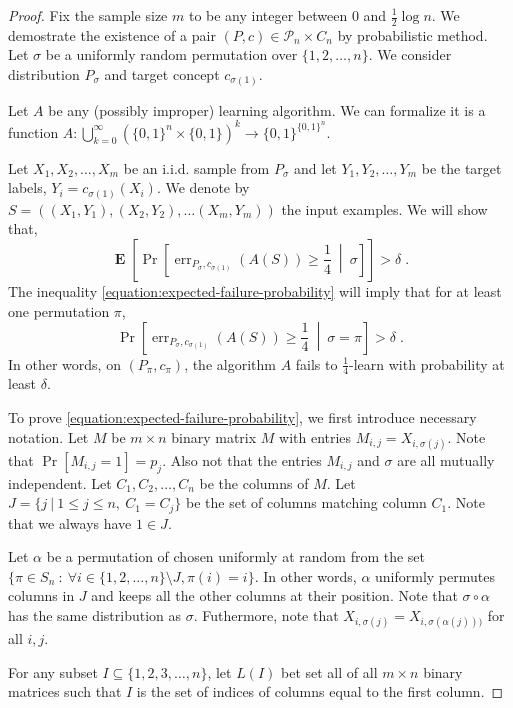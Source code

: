 \documentclass[12pt]{article}
\renewcommand{\P}{\mathcal{P}}
\DeclareMathOperator{\err}{err}
\DeclareMathOperator{\Exp}{\mathbf{E}}
\begin{document}
\begin{proof}
Fix the sample size $m$ to be any integer between $0$ and $\frac{1}{2} \log n$.
We demostrate the existence of a pair $(P,c) \in \P_n \times C_n$ by
probabilistic method. Let $\sigma$ be a uniformly random permutation over
$\{1,2,\dots,n\}$. We consider distribution $P_\sigma$ and target concept
$c_{\sigma(1)}$.

Let $A$ be any (possibly improper) learning algorithm. We can formalize
it is a function $A:\bigcup_{k=0}^\infty (\{0,1\}^n \times \{0,1\})^k \to
\{0,1\}^{\{0,1\}^n}$.

Let $X_1, X_2, \dots, X_m$ be an i.i.d. sample from $P_\sigma$ and
let $Y_1, Y_2, \dots, Y_m$ be the target labels, $Y_i = c_{\sigma(1)}(X_i)$.
We denote by $S = ((X_1, Y_1), (X_2, Y_2), \dots (X_m, Y_m))$ the input examples.
We will show that,
\begin{equation}
\label{equation:expected-failure-probability}
\Exp \left[ \Pr \left[\err_{P_\sigma,c_{\sigma(1)}}(A(S)) \ge \frac{1}{4} \ \middle| \ \sigma \right] \right] > \delta \; .
\end{equation}
The inequality \eqref{equation:expected-failure-probability} will imply that for at least one permutation $\pi$,
$$
\Pr \left[\err_{P_\sigma,c_{\sigma(1)}}(A(S)) \ge \frac{1}{4} \ \middle| \ \sigma = \pi \right] > \delta \; .
$$
In other words, on $(P_\pi, c_\pi)$, the algorithm $A$ fails to
$\frac{1}{4}$-learn with probability at least $\delta$.

To prove \eqref{equation:expected-failure-probability}, we first introduce
necessary notation. Let $M$ be $m \times n$ binary matrix $M$ with entries
$M_{i,j} = X_{i,\sigma(j)}$. Note that $\Pr[M_{i,j} = 1] = p_j$. Also not that
the entries $M_{i,j}$ and $\sigma$ are all mutually independent. Let $C_1, C_2,
\dots, C_n$ be the columns of $M$. Let $J = \{ j ~|~ 1 \le j \le n, \ C_1 = C_j \}$
be the set of columns matching column $C_1$. Note that we always have $1 \in J$.

Let $\alpha$ be a permutation of chosen uniformly at random from the set $\{ \pi
\in S_n ~:~ \forall i \in \{1,2,\dots,n\} \setminus J, \pi(i) = i \}$. In other
words, $\alpha$ uniformly permutes columns in $J$ and keeps all the other
columns at their position. Note that $\sigma \circ \alpha$ has the same
distribution as $\sigma$. Futhermore, note that $X_{i,\sigma(j)} =
X_{i,\sigma(\alpha(j)))}$ for all $i,j$.

For any subset $I \subseteq \{1,2,3,\dots,n\}$, let $L(I)$ bet set all of all $m
\times n$ binary matrices such that $I$ is the set of indices of columns equal
to the first column.


\end{proof}
\end{document}
